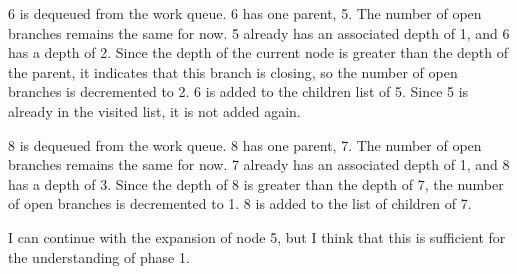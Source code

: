6 is dequeued from the work queue. 6 has one parent, 5. The number of
open branches remains the same for now. 5 already has an associated
depth of 1, and 6 has a depth of 2. Since the depth of the current node
is greater than the depth of the parent, it indicates that this branch
is closing, so the number of open branches is decremented to 2. 6 is
added to the children list of 5. Since 5 is already in the visited list,
it is not added again.

8 is dequeued from the work queue. 8 has one parent, 7. The number of
open branches remains the same for now. 7 already has an associated
depth of 1, and 8 has a depth of 3. Since the depth of 8 is greater than
the depth of 7, the number of open branches is decremented to 1. 8 is
added to the list of children of 7.

I can continue with the expansion of node 5, but I think that this is
sufficient for the understanding of phase 1.
